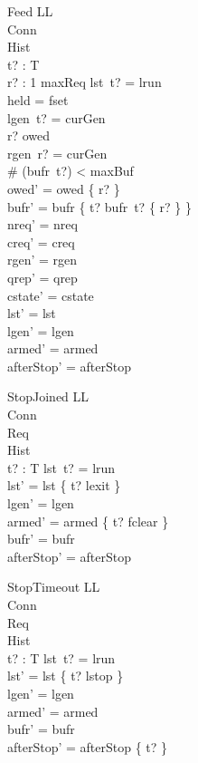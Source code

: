 \documentclass[a4paper,10pt,fleqn]{article}
\begin{document}
\begin{schema}{Feed}
  \Delta LL \\
  \Xi Conn \\
  \Xi Hist \\
  t? : T \\
  r? : 1 \upto maxReq
\where
  lst~t? = lrun \\
  held = fset \\
  lgen~t? = curGen \\
  r? \in owed \\
  rgen~r? = curGen \\
  \# (bufr~t?) < maxBuf \\
  owed' = owed \setminus \{ r? \} \\
  bufr' = bufr \oplus \{ t? \mapsto bufr~t? \cup \{ r? \} \} \\
  nreq' = nreq \\
  creq' = creq \\
  rgen' = rgen \\
  qrep' = qrep \\
  cstate' = cstate \\
  lst' = lst \\
  lgen' = lgen \\
  armed' = armed \\
  afterStop' = afterStop
\end{schema}

\begin{schema}{StopJoined}
  \Delta LL \\
  \Xi Conn \\
  \Xi Req \\
  \Xi Hist \\
  t? : T
\where
  lst~t? = lrun \\
  lst' = lst \oplus \{ t? \mapsto lexit \} \\
  lgen' = lgen \\
  armed' = armed \oplus \{ t? \mapsto fclear \} \\
  bufr' = bufr \\
  afterStop' = afterStop
\end{schema}

\begin{schema}{StopTimeout}
  \Delta LL \\
  \Xi Conn \\
  \Xi Req \\
  \Xi Hist \\
  t? : T
\where
  lst~t? = lrun \\
  lst' = lst \oplus \{ t? \mapsto lstop \} \\
  lgen' = lgen \\
  armed' = armed \\
  bufr' = bufr \\
  afterStop' = afterStop \oplus \{ t?  \}
\end{schema}
\end{document}
